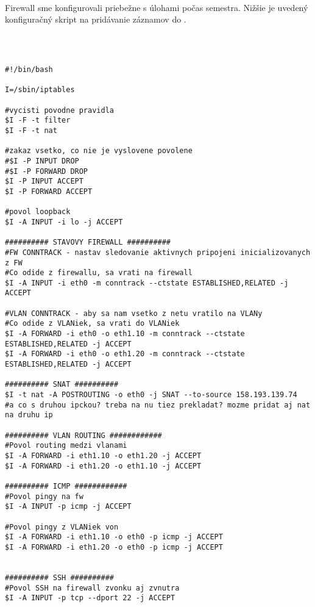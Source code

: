 \paragraph{}
Firewall sme konfigurovali priebežne s úlohami počas semestra. Nižšie je uvedený konfiguračný skript na pridávanie záznamov do .

\noindent
{\selectfont
\\

\begin{small}

\begin{verbatim}

#!/bin/bash

I=/sbin/iptables

#vycisti povodne pravidla
$I -F -t filter
$I -F -t nat

#zakaz vsetko, co nie je vyslovene povolene
#$I -P INPUT DROP
#$I -P FORWARD DROP
$I -P INPUT ACCEPT
$I -P FORWARD ACCEPT

#povol loopback
$I -A INPUT -i lo -j ACCEPT

########## STAVOVY FIREWALL ##########
#FW CONNTRACK - nastav sledovanie aktivnych pripojeni inicializovanych z FW
#Co odide z firewallu, sa vrati na firewall
$I -A INPUT -i eth0 -m conntrack --ctstate ESTABLISHED,RELATED -j ACCEPT

#VLAN CONNTRACK - aby sa nam vsetko z netu vratilo na VLANy
#Co odide z VLANiek, sa vrati do VLANiek
$I -A FORWARD -i eth0 -o eth1.10 -m conntrack --ctstate ESTABLISHED,RELATED -j ACCEPT
$I -A FORWARD -i eth0 -o eth1.20 -m conntrack --ctstate ESTABLISHED,RELATED -j ACCEPT

########## SNAT ##########
$I -t nat -A POSTROUTING -o eth0 -j SNAT --to-source 158.193.139.74
#a co s druhou ipckou? treba na nu tiez prekladat? mozme pridat aj nat na druhu ip

########## VLAN ROUTING ############
#Povol routing medzi vlanami
$I -A FORWARD -i eth1.10 -o eth1.20 -j ACCEPT
$I -A FORWARD -i eth1.20 -o eth1.10 -j ACCEPT

########## ICMP ############
#Povol pingy na fw
$I -A INPUT -p icmp -j ACCEPT

#Povol pingy z VLANiek von
$I -A FORWARD -i eth1.10 -o eth0 -p icmp -j ACCEPT
$I -A FORWARD -i eth1.20 -o eth0 -p icmp -j ACCEPT


########## SSH ##########
#Povol SSH na firewall zvonku aj zvnutra
$I -A INPUT -p tcp --dport 22 -j ACCEPT



\end{verbatim}
\end{small}}
